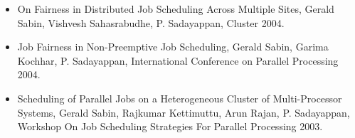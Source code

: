 \begin{itemize}
 	 \item On Fairness in Distributed Job Scheduling Across Multiple Sites,
 	      Gerald Sabin, Vishvesh Sahasrabudhe, P. Sadayappan, Cluster 2004.
 	
     \item Job Fairness in Non-Preemptive Job Scheduling, Gerald Sabin,
 	      Garima Kochhar, P. Sadayappan, International Conference on Parallel
 	      Processing 2004.
 	
 	   \item Scheduling of Parallel Jobs on a Heterogeneous Cluster of
 	     Multi-Processor Systems, Gerald Sabin, Rajkumar Kettimuttu, Arun
 	     Rajan, P. Sadayappan, Workshop On Job Scheduling Strategies For
 	     Parallel Processing 2003.
 \end{itemize}
 
